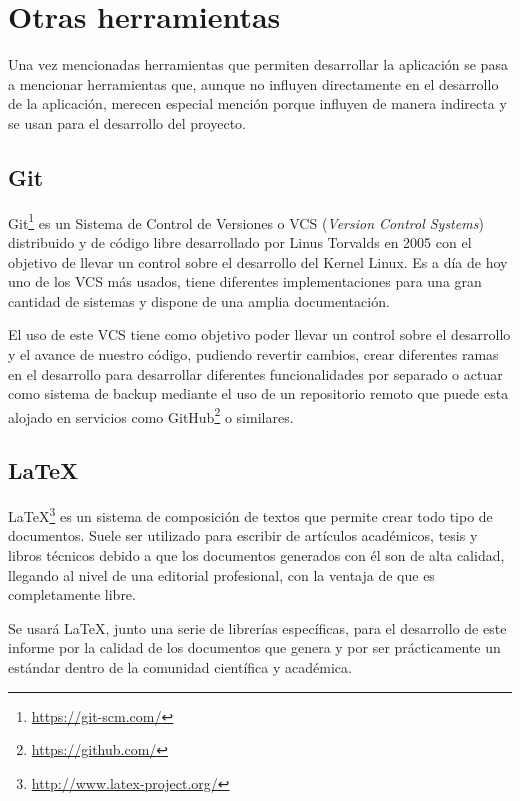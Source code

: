 
\section{Otras herramientas}

Una vez mencionadas herramientas que permiten desarrollar la aplicación se pasa a mencionar herramientas que, aunque no influyen directamente en el desarrollo de la aplicación, merecen especial mención porque influyen de manera indirecta y se usan para el desarrollo del proyecto.

\subsection{Git}

Git\footnote{\url{https://git-scm.com/}} es un Sistema de Control de Versiones o VCS (\textit{Version Control Systems}) distribuido y de código libre desarrollado por Linus Torvalds en 2005 con el objetivo de llevar un control sobre el desarrollo del Kernel Linux. Es a día de hoy uno de los VCS más usados, tiene diferentes implementaciones para una gran cantidad de sistemas y dispone de una amplia documentación. 

El uso de este VCS tiene como objetivo poder llevar un control sobre el desarrollo y el avance de nuestro código, pudiendo revertir cambios, crear diferentes ramas en el desarrollo para desarrollar diferentes funcionalidades por separado o actuar como sistema de backup mediante el uso de un repositorio remoto que puede esta alojado en servicios como GitHub\footnote{\url{https://github.com/}} o similares.

\subsection{\LaTeX}

LaTeX\footnote{\url{http://www.latex-project.org/}}  es un sistema de composición de textos que permite crear todo tipo de documentos. Suele ser utilizado para escribir de artículos académicos, tesis y libros técnicos debido a que los documentos generados con él son de alta calidad, llegando al nivel de una editorial profesional, con la ventaja de que es completamente libre.

Se usará LaTeX, junto una serie de librerías específicas, para el desarrollo de este informe por la calidad de los documentos que genera y por ser prácticamente un estándar dentro de la comunidad científica y académica. 